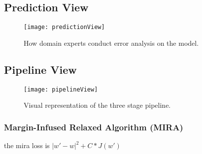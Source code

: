 \subsection{Prediction View}

\begin{figure}[htbp]
\centering
\vspace{-2mm}
 \texttt{[image: predictionView]}
 \caption{How domain experts conduct error analysis on the model.}
\label{fig:modelPipeline}
\end{figure}


\subsection{Pipeline View}

\begin{figure}[htbp]
\centering
\vspace{-2mm}
 \texttt{[image: pipelineView]}
 \caption{Visual representation of the three stage pipeline.}
\label{fig:modelPipeline}
\end{figure}

\subsubsection{Margin-Infused Relaxed Algorithm (MIRA)}
the mira loss is $|w' - w|^2 + C * J(w')$
